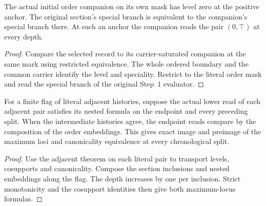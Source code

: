 \begin{theorem}
\label{hir:g1-initial-positive-companion-special-value}
\leanok
The actual initial order companion on its own mask has level zero at
the positive anchor. The original section's special branch is
equivalent to the companion's special branch there. At such an
anchor the companion reads the pair $(0,\top)$ at every depth.
\end{theorem}
\begin{proof}
Compare the selected record to its carrier-saturated companion at the
same mark using restricted equivalence. The whole ordered boundary
and the common carrier identify the level and speciality. Restrict to
the literal order mask and read the special branch of the original
Step~1 evaluator.
\end{proof}

\begin{theorem}
\label{hir:g1-normal-nested-flag}
\leanok
For a finite flag of literal adjacent histories, suppose the actual
lower read of each adjacent pair satisfies its nested formula on the
endpoint and every preceding split. When the intermediate histories
agree, the endpoint reads compare by the composition of the order
embeddings. This gives exact image and preimage of the maximum
loci and canonicality equivalence at every chronological split.
\end{theorem}
\begin{proof}
Use the adjacent theorem on each literal pair to transport levels,
cosupports and canonicality. Compose the section inclusions and
nested embeddings along the flag. The depth increases by one per
inclusion. Strict monotonicity and the cosupport identities then give
both maximum-locus formulas.
\end{proof}

